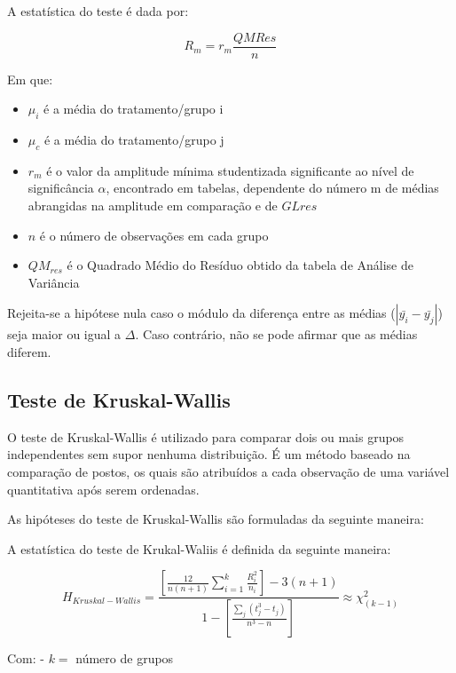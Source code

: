 \documentclass[
  portuguese,
]{estat/estat}
\begin{document}

A estatística do teste é dada por:

\[R_m = r_m \frac{QMRes}{n}\]

Em que:

\begin{itemize}
\item
  \(\mu_i\) é a média do tratamento/grupo i
\item
  \(\mu_c\) é a média do tratamento/grupo j
\item
  \(r_m\) é o valor da amplitude mínima studentizada significante ao
  nível de significância \(\alpha\), encontrado em tabelas, dependente
  do número m de médias abrangidas na amplitude em comparação e de
  \(GLres\)
\item
  \(n\) é o número de observações em cada grupo
\item
  \(QM_{res}\) é o Quadrado Médio do Resíduo obtido da tabela de Análise
  de Variância
\end{itemize}

Rejeita-se a hipótese nula caso o módulo da diferença entre as médias
(\(|\bar{y_i} - \bar{y_j}|\)) seja maior ou igual a \(\Delta\). Caso
contrário, não se pode afirmar que as médias diferem.

\subsection{Teste de Kruskal-Wallis}\label{teste-de-kruskal-wallis}

O teste de Kruskal-Wallis é utilizado para comparar dois ou mais grupos
independentes sem supor nenhuma distribuição. É um método baseado na
comparação de postos, os quais são atribuídos a cada observação de uma
variável quantitativa após serem ordenadas.

As hipóteses do teste de Kruskal-Wallis são formuladas da seguinte
maneira:


A estatística do teste de Krukal-Waliis é definida da seguinte maneira:

\[
H_{Kruskal-Wallis}=
    \displaystyle\frac{\displaystyle\left[ \frac{12}{n(n+1)} \sum_{i=1}^{k} \frac{R_i^2}{n_i} \right] - 3(n+1)}
    {\displaystyle1- \left[ \frac{\displaystyle\sum_{j}^{}(t_j^3 - t_j)}{n^3 - n}\right]} 
\approx \chi^2_{(k-1)}
\]

Com: - \(k=\) número de grupos
\end{document}
